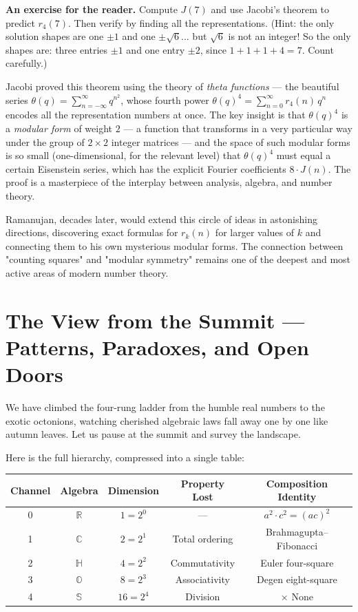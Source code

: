 \textbf{An exercise for the reader.} Compute $J(7)$ and use Jacobi's theorem to predict $r_4(7)$. Then verify by finding all the representations. (Hint: the only solution shapes are one $\pm 1$ and one $\pm\sqrt{6}$... but $\sqrt{6}$ is not an integer! So the only shapes are: three entries $\pm 1$ and one entry $\pm 2$, since $1 + 1 + 1 + 4 = 7$. Count carefully.)

Jacobi proved this theorem using the theory of \textit{theta functions} --- the beautiful series $\theta(q) = \sum_{n=-\infty}^{\infty} q^{n^2}$, whose fourth power $\theta(q)^4 = \sum_{n=0}^{\infty} r_4(n)\, q^n$ encodes all the representation numbers at once. The key insight is that $\theta(q)^4$ is a \textit{modular form} of weight $2$ --- a function that transforms in a very particular way under the group of $2 \times 2$ integer matrices --- and the space of such modular forms is so small (one-dimensional, for the relevant level) that $\theta(q)^4$ must equal a certain Eisenstein series, which has the explicit Fourier coefficients $8 \cdot J(n)$. The proof is a masterpiece of the interplay between analysis, algebra, and number theory.

Ramanujan, decades later, would extend this circle of ideas in astonishing directions, discovering exact formulas for $r_k(n)$ for larger values of $k$ and connecting them to his own mysterious modular forms. The connection between "counting squares" and "modular symmetry" remains one of the deepest and most active areas of modern number theory.


\bigskip


\section{The View from the Summit --- Patterns, Paradoxes, and Open Doors}

We have climbed the four-rung ladder from the humble real numbers to the exotic octonions, watching cherished algebraic laws fall away one by one like autumn leaves. Let us pause at the summit and survey the landscape.

Here is the full hierarchy, compressed into a single table:

\begin{center}
\begin{tabular}{c c c c c}
\toprule
Channel & Algebra & Dimension & Property Lost & Composition Identity \\
\midrule
0 & $\mathbb{R}$ & $1 = 2^0$ & --- & $a^2 \cdot c^2 = (ac)^2$ \\
1 & $\mathbb{C}$ & $2 = 2^1$ & Total ordering & Brahmagupta--Fibonacci \\
2 & $\mathbb{H}$ & $4 = 2^2$ & Commutativity & Euler four-square \\
3 & $\mathbb{O}$ & $8 = 2^3$ & Associativity & Degen eight-square \\
4 & $\mathbb{S}$ & $16 = 2^4$ & Division & \ensuremath{\times} None \\
\bottomrule
\end{tabular}
\end{center}

